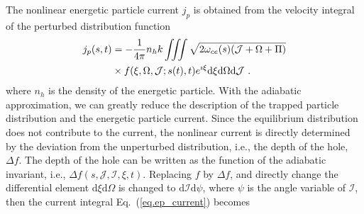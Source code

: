 The nonlinear energetic particle current $j_p$ is obtained from the velocity integral of the perturbed distribution function 
\cite{zheng2024}
\begin{equation}\label{eq.ep_current}
    \begin{aligned}
j_p(s,t) & = -\frac{1}{ 4 \pi } n_h k \iiint \sqrt{2 \omega_{ce}(s)(\mathcal{J}+\Omega+\Pi)} 
 \\
 &\times f(\xi,\Omega,\mathcal{J};s(t),t)e^{\imath \xi} \rm d \xi \rm d \Omega \rm d \mathcal{J}~.
    \end{aligned}
\end{equation}
where $n_h$ is the density of the energetic particle.
With the adiabatic approximation, we can greatly reduce the description of the trapped particle distribution and the energetic particle current.
Since the equilibrium distribution does not contribute to the current, the nonlinear current is directly determined by 
the deviation from the unperturbed distribution, i.e., the depth of the hole,
$\Delta f$.
The depth of the hole can be written as the function of the adiabatic invariant, i.e., $\Delta f(s,\mathcal{J},\mathcal{I},\xi,t)$.
Replacing $f$ by $\Delta f$, and directly change the differential element $\mathrm{d}\xi\mathrm{d}\Omega$ is changed to $\mathrm{d}\mathcal{I}\mathrm{d}\psi$, where $\psi$ is the angle variable of $\mathcal{I}$, then the current integral  Eq.~(\ref{eq.ep_current}) becomes 
